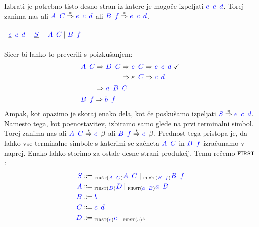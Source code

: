 \documentclass{article}
\newcommand{\FIRST}{\textsc{first}}
\newcommand{\OK}{\ \checkmark}
\newcommand{\Symbol}[1]{\textcolor{blue}{#1}}
\newcommand{\Null}{\varepsilon}
\newcommand{\Arrow}{\Coloneq}
\newcommand{\Derive}{\Rightarrow}
\newcommand{\DeriveStar}{\overset{\ast}{\Rightarrow}}
\newcommand{\Seq}{{\ \,}}
\newcommand{\Union}{\mathrel{|}}
\newcommand{\Lk}[1]{{}_{{#1}}}
\begin{document}
Izbrati je potrebno tisto desno stran iz katere je mogoče izpeljati $\Symbol{e} \Seq \Symbol{c} \Seq \Symbol{d}$.
Torej zanima nas ali $\Symbol{A} \Seq \Symbol{C} \DeriveStar \Symbol{e} \Seq \Symbol{c} \Seq \Symbol{d}$ ali $\Symbol{B} \Seq \Symbol{f} \DeriveStar \Symbol{e} \Seq \Symbol{c} \Seq \Symbol{d}$.
\begin{center}
\begin{tabular}{|c|c|c|}
  \hline
  $\underline{\Symbol{e}} \Seq \Symbol{c} \Seq \Symbol{d}$ & $\underline{\Symbol{S}}$ & $\Symbol{A} \Seq \Symbol{C} \Union \Symbol{B} \Seq \Symbol{f}$ \\ 
  \hline
\end{tabular}
\end{center}
Sicer bi lahko to preverili s poizkušanjem:
\begin{equation*}
  \begin{aligned}[t]
    &\Symbol{A} \Seq \Symbol{C} \begin{aligned}[t]
      &\Derive \Symbol{D} \Seq \Symbol{C} \begin{aligned}[t]
        &\Derive \Symbol{e} \Seq \Symbol{C} \Derive \Symbol{e} \Seq \Symbol{c} \Seq \Symbol{d} \OK\\
        &\Derive \Null \Seq \Symbol{C} \Derive \Symbol{c} \Seq \Symbol{d}
      \end{aligned}\\
      &\Derive \Symbol{a} \Seq \Symbol{B} \Seq \Symbol{C}
    \end{aligned}\\
    &\Symbol{B} \Seq \Symbol{f} \Derive \Symbol{b} \Seq \Symbol{f}
  \end{aligned}
\end{equation*}
Ampak, kot opazimo je skoraj enako dela, kot če poskušamo izpeljati $\Symbol{S} \DeriveStar \Symbol{e} \Seq \Symbol{c} \Seq \Symbol{d}$.
Namesto tega, kot poenostavitev, izbiramo samo glede na prvi terminalni simbol.
Torej zanima nas ali $\Symbol{A} \Seq \Symbol{C} \DeriveStar \Symbol{e} \Seq \beta$ ali $\Symbol{B} \Seq \Symbol{f} \DeriveStar \Symbol{e} \Seq \beta$.
Prednost tega pristopa je, da lahko vse terminalne simbole s katerimi se začneta $\Symbol{A} \Seq \Symbol{C}$ in $\Symbol{B} \Seq \Symbol{f}$ izračunamo v naprej.
Enako lahko storimo za ostale desne strani produkcij.
Temu rečemo $\FIRST$:
\begin{equation*}
  \begin{aligned}
    \Symbol{S} &\Arrow \Lk{\FIRST(\Symbol{A} \Seq \Symbol{C})} \Symbol{A} \Seq \Symbol{C} \Union \Lk{\FIRST(\Symbol{B} \Seq \Symbol{f})} \Symbol{B} \Seq \Symbol{f} \\
    \Symbol{A} &\Arrow \Lk{\FIRST(\Symbol{D})} \Symbol{D} \Union \Lk{\FIRST(\Symbol{a} \Seq \Symbol{B})} \Symbol{a} \Seq \Symbol{B} \\
    \Symbol{B} &\Arrow \Symbol{b}\\
    \Symbol{C} &\Arrow \Symbol{c} \Seq \Symbol{d}\\
    \Symbol{D} &\Arrow \Lk{\FIRST(\Symbol{e})} \Symbol{e} \Union \Lk{\FIRST(\Null)} \Null
  \end{aligned}
\end{equation*}
\end{document}
